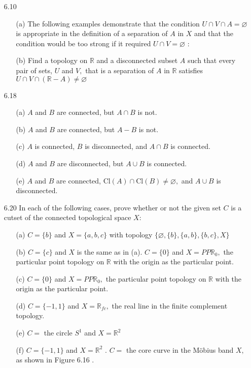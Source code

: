\documentclass[12pt]{article}
\begin{document}
\begin{enumerate}
		\item[6.10] 
		\begin{enumerate}
			\item[(a)] The following examples demonstrate that the condition $U \cap V \cap A = \varnothing$ is appropriate in the definition of a separation of $A$ in $X$ and that the condition would be too strong if it required $U \cap V = \varnothing$ :
			\item[(b)] Find a topology on $\mathbb { R }$ and a disconnected subset $A$ such that every pair of
			sets, $U$ and $V ,$ that is a separation of $A$ in $\mathbb { R }$ satisfies $U \cap V \cap ( \mathbb { R } - A ) \neq \varnothing$
		\end{enumerate}
		\item[6.18] 
		\begin{enumerate}
			\item[(a)] $A$ and $B$ are connected, but $A \cap B$ is not.
			\item[(b)] $A$ and $B$ are connected, but $A - B$ is not.
			\item[(c)] $A$ is connected, $B$ is disconnected, and $A \cap B$ is connected.
			\item[(d)] $A$ and $B$ are disconnected, but $A \cup B$ is connected.
			\item[(e)] $A$ and $B$ are connected, $\mathrm { Cl } ( A ) \cap \mathrm { Cl } ( B ) \neq \varnothing ,$ and $A \cup B$ is disconnected.
		\end{enumerate}
		
		\item[6.20] In each of the following cases, prove whether or not the given set $C$ is a cutset of the connected topological space $X :$
		\begin{enumerate}
			\item[(a)] $C = \{ b \}$ and $X = \{ a , b , c \}$ with topology $\{ \varnothing , \{ b \} , \{ a , b \} , \{ b , c \} , X \}$
			\item[(b)] $C = \{ c \}$ and $X$ is the same as in (a).
			$C = \{ 0 \}$ and $X = P P \mathbb { R } _ { 0 } ,$ the particular point topology on $\mathbb { R }$ with the origin as the particular point.
			\item[(c)] $C = \{ 0 \}$ and $X = P P \mathbb { R } _ { 0 } ,$ the particular point topology on $\mathbb { R }$ with the
			origin as the particular point.
			\item[(d)]	$C = \{ - 1,1 \}$ and $X = \mathbb { R } _ { f c } ,$ the real line in the finite complement topology.
			\item[(e)] $C =$ the circle $S ^ { 1 }$ and $X = \mathbb { R } ^ { 2 }$
			\item[(f)]$C = \{ - 1,1 \}$ and $X = \mathbb { R } ^ { 2 }$ .
			$C =$ the core curve in the Möbius band $X ,$ as shown in Figure 6.16 .
		\end{enumerate}
		

\end{enumerate}
\end{document}
